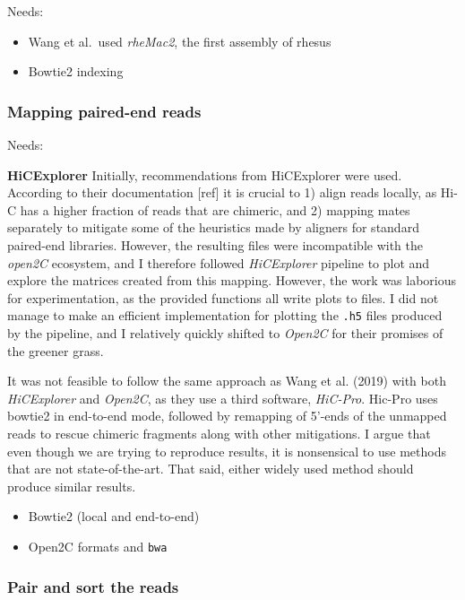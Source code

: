 \documentclass[
  a4paper,
]{scrbook}
\providecommand{\tightlist}{%
  \setlength{\itemsep}{0pt}\setlength{\parskip}{0pt}}\usepackage{longtable,booktabs,array}
\let\oldemph\emph
\renewcommand\emph[1]{\oldemph{\color{gray}#1}}
\begin{document}
Needs:

\begin{itemize}
\tightlist
\item
  Wang et al.~used \emph{rheMac2}, the first assembly of rhesus
\item
  Bowtie2 indexing
\end{itemize}

\subsubsection{Mapping paired-end reads}\label{mapping-paired-end-reads}

Needs:

\textbf{HiCExplorer} Initially, recommendations from HiCExplorer were
used. According to their documentation {[}ref{]} it is crucial to 1)
align reads locally, as Hi-C has a higher fraction of reads that are
chimeric, and 2) mapping mates separately to mitigate some of the
heuristics made by aligners for standard paired-end libraries. However,
the resulting files were incompatible with the \emph{open2C} ecosystem,
and I therefore followed \emph{HiCExplorer} pipeline to plot and explore
the matrices created from this mapping. However, the work was laborious
for experimentation, as the provided functions all write plots to files.
I did not manage to make an efficient implementation for plotting the
\texttt{.h5} files produced by the pipeline, and I relatively quickly
shifted to \emph{Open2C} for their promises of the greener grass.

It was not feasible to follow the same approach as Wang et al. (2019)
with both \emph{HiCExplorer} and \emph{Open2C}, as they use a third
software, \emph{HiC-Pro}. Hic-Pro uses bowtie2 in end-to-end mode,
followed by remapping of 5'-ends of the unmapped reads to rescue
chimeric fragments along with other mitigations. I argue that even
though we are trying to reproduce results, it is nonsensical to use
methods that are not state-of-the-art. That said, either widely used
method should produce similar results.

\begin{itemize}
\tightlist
\item
  Bowtie2 (local and end-to-end)
\item
  Open2C formats and \texttt{bwa}
\end{itemize}

\subsubsection{Pair and sort the reads}\label{pair-and-sort-the-reads}
\end{document}
